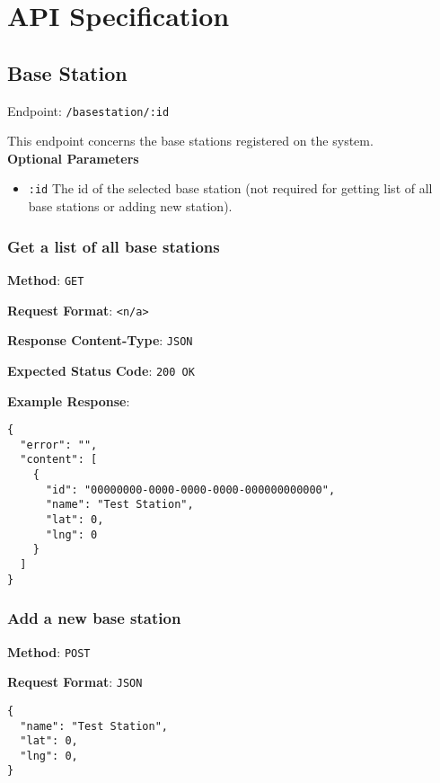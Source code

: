 \chapter{API Specification}

\section{Base Station}

Endpoint: \texttt{/basestation/:id}

\noindent
This endpoint concerns the base stations registered on the system.\\

\noindent
\textbf{Optional Parameters}
\begin{itemize}
   \item \texttt{:id} \textemdash The id of the selected base station (not required for getting list of all base stations or adding new station).
\end{itemize}


\subsection{Get a list of all base stations}

\noindent
\textbf{Method}: \texttt{GET}

\noindent
\textbf{Request Format}: \texttt{<n/a>}

\noindent
\textbf{Response Content-Type}: \texttt{JSON}

\noindent
\textbf{Expected Status Code}: \texttt{200 OK}

\noindent
\textbf{Example Response}:
\begin{verbatim}
{ 
  "error": "",
  "content": [
    {
      "id": "00000000-0000-0000-0000-000000000000",
      "name": "Test Station",
      "lat": 0,
      "lng": 0
    }
  ]
}
\end{verbatim}


\subsection{Add a new base station}

\noindent
\textbf{Method}: \texttt{POST}

\noindent
\textbf{Request Format}: \texttt{JSON}
\begin{verbatim}
{ 
  "name": "Test Station",
  "lat": 0,
  "lng": 0,
}
\end{verbatim}

